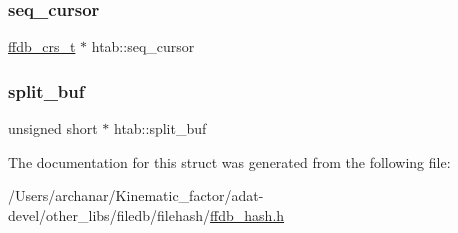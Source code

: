 \mbox{\label{structhtab_a596f77e06b4b020288be1edf0bf9f62b}} 
\subsubsection{\texorpdfstring{seq\_cursor}{seq\_cursor}}
{\footnotesize\ttfamily \mbox{\hyperlink{adat-devel_2other__libs_2filedb_2filehash_2ffdb__hash_8h_a103d84beefb6d7306cb252c4d7f25479}{ffdb\+\_\+crs\+\_\+t}} $\ast$ htab\+::seq\+\_\+cursor}

\mbox{\label{structhtab_a7d9a4d73113dadda7d6501657a53358c}} 
\subsubsection{\texorpdfstring{split\_buf}{split\_buf}}
{\footnotesize\ttfamily unsigned short $\ast$ htab\+::split\+\_\+buf}



The documentation for this struct was generated from the following file\+:\begin{DoxyCompactItemize}
\item 
/\+Users/archanar/\+Kinematic\+\_\+factor/adat-\/devel/other\+\_\+libs/filedb/filehash/\mbox{\hyperlink{adat-devel_2other__libs_2filedb_2filehash_2ffdb__hash_8h}{ffdb\+\_\+hash.\+h}}\end{DoxyCompactItemize}
